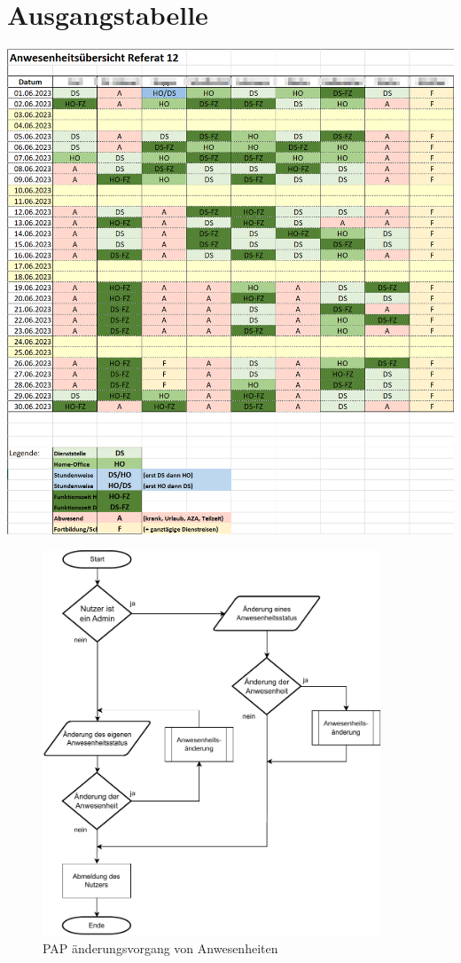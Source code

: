 \section{Ausgangstabelle}
\label{abb:Ausgangstabelle}
\includegraphics[page=1,height=1\textwidth]{anhang/abb/Tabelle.png}


\begin{figure}[htb]
    \centering
    \includegraphics[width=0.9\textwidth,angle=0]{anhang/abb/PAP_Kurz.pdf}
    \caption[Beschreibung]{PAP änderungsvorgang von Anwesenheiten}
    \label{abb:PAP}
\end{figure}